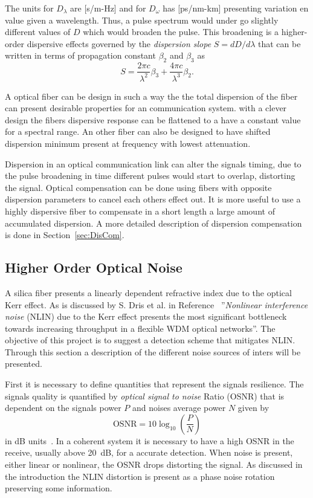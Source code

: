 The units for $D_\lambda$ are [s/m-Hz] and for $D_\omega$ has [ps/nm-km] presenting variation en value given a wavelength. Thus, a pulse spectrum would under go slightly different values of $D$ which would broaden the pulse. This broadening is a higher-order dispersive effects governed by the \emph{dispersion slope}   $S=dD/d\lambda$ that can be written in terms of propagation constant $\beta_2$ and $\beta_3$ as
\begin{equation}
S=\frac{2\pi c}{\lambda^2}\beta_3+\frac{4\pi c}{\lambda^3}\beta_2.
\end{equation}

A optical fiber can be design in such a way the the total dispersion of the fiber can present desirable properties for an communication system. with a clever design the fibers dispersive response can be flattened to a have a constant value for a spectral range. An other fiber can also be designed to have shifted dispersion minimum present at frequency with lowest attenuation. 

Dispersion in an optical communication link can alter the signals timing, due to the pulse broadening in time different pulses would start to overlap, distorting the signal. Optical compensation can be done using fibers with opposite dispersion parameters  to cancel each others effect out. It is more useful to use a highly dispersive fiber to compensate in a short length a large amount of accumulated dispersion. A more detailed description of dispersion compensation is done in Section~\ref{sec:DisCom}.  

\subsection{Higher Order Optical Noise}\label{sec:NLPN}
A silica fiber presents a linearly dependent refractive index due to the optical Kerr effect. As is discussed by S. Dris et al. in Reference~\cite{dris2017analysis} ''\textit{Nonlinear interference noise} (NLIN) due to the Kerr effect presents the most significant bottleneck towards increasing throughput in a flexible WDM optical networks''. The objective of this project is to suggest a detection scheme that mitigates NLIN.  Through this section a description of the different noise sources of inters will be presented. 

First it is necessary to define quantities that represent the signals resilience.  The signals quality is quantified by  \textit{optical signal to noise} Ratio (OSNR) that is dependent on the signals power $P$ and noises average power $N$ given by
\begin{equation}
\text{OSNR}=10\log_{10}\left(\frac{P}{N}\right)
\end{equation}
 in dB units~\cite{FiberAgrawal}. In a coherent system it is necessary to have a high OSNR in the receive, usually above 20~dB, for a accurate detection. When noise is present, either linear or nonlinear, the OSNR drops distorting the signal. As discussed in the introduction the NLIN distortion is present as a phase noise rotation preserving some information. 
 
